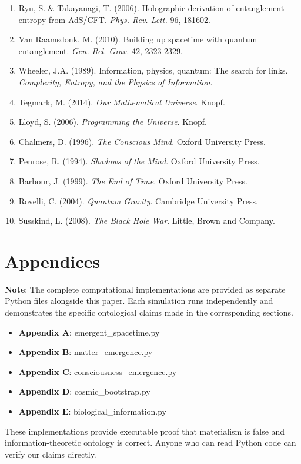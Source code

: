 \documentclass[12pt]{article}
\begin{document}
\begin{enumerate}
\item Ryu, S. \& Takayanagi, T. (2006). Holographic derivation of entanglement entropy from AdS/CFT. \textit{Phys. Rev. Lett.} 96, 181602.
\item Van Raamsdonk, M. (2010). Building up spacetime with quantum entanglement. \textit{Gen. Rel. Grav.} 42, 2323-2329.
\item Wheeler, J.A. (1989). Information, physics, quantum: The search for links. \textit{Complexity, Entropy, and the Physics of Information}.
\item Tegmark, M. (2014). \textit{Our Mathematical Universe}. Knopf.
\item Lloyd, S. (2006). \textit{Programming the Universe}. Knopf.
\item Chalmers, D. (1996). \textit{The Conscious Mind}. Oxford University Press.
\item Penrose, R. (1994). \textit{Shadows of the Mind}. Oxford University Press.
\item Barbour, J. (1999). \textit{The End of Time}. Oxford University Press.
\item Rovelli, C. (2004). \textit{Quantum Gravity}. Cambridge University Press.
\item Susskind, L. (2008). \textit{The Black Hole War}. Little, Brown and Company.
\end{enumerate}

\newpage

\section*{Appendices}

\textbf{Note}: The complete computational implementations are provided as separate Python files alongside this paper. Each simulation runs independently and demonstrates the specific ontological claims made in the corresponding sections.

\begin{itemize}
\item \textbf{Appendix A}: emergent\_spacetime.py
\item \textbf{Appendix B}: matter\_emergence.py  
\item \textbf{Appendix C}: consciousness\_emergence.py
\item \textbf{Appendix D}: cosmic\_bootstrap.py
\item \textbf{Appendix E}: biological\_information.py
\end{itemize}

These implementations provide executable proof that materialism is false and information-theoretic ontology is correct. Anyone who can read Python code can verify our claims directly.
\end{document}
